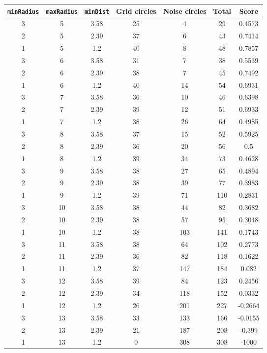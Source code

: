 \documentclass[letterpaper, 12pt]{article}
\begin{document}
\begin{longtable}{|c|c|c|c|c|c|c|}
\hline
\textbf{\texttt{minRadius}} & \textbf{\texttt{maxRadius}} & \textbf{\texttt{minDist}} & \textbf{Grid circles} & \textbf{Noise circles} & \textbf{Total} & \textbf{Score} \\
\hline
3 & 5 & 3.58 & 25 & 4 & 29 & 0.4573 \\
\hline
2 & 5 & 2.39 & 37 & 6 & 43 & 0.7414 \\
\hline
1 & 5 & 1.2 & 40 & 8 & 48 & 0.7857 \\
\hline
3 & 6 & 3.58 & 31 & 7 & 38 & 0.5539 \\
\hline
2 & 6 & 2.39 & 38 & 7 & 45 & 0.7492 \\
\hline
1 & 6 & 1.2 & 40 & 14 & 54 & 0.6931 \\
\hline
3 & 7 & 3.58 & 36 & 10 & 46 & 0.6398 \\
\hline
2 & 7 & 2.39 & 39 & 12 & 51 & 0.6933 \\
\hline
1 & 7 & 1.2 & 38 & 26 & 64 & 0.4985 \\
\hline
3 & 8 & 3.58 & 37 & 15 & 52 & 0.5925 \\
\hline
2 & 8 & 2.39 & 36 & 20 & 56 & 0.5 \\
\hline
1 & 8 & 1.2 & 39 & 34 & 73 & 0.4628 \\
\hline
3 & 9 & 3.58 & 38 & 27 & 65 & 0.4894 \\
\hline
2 & 9 & 2.39 & 38 & 39 & 77 & 0.3983 \\
\hline
1 & 9 & 1.2 & 39 & 71 & 110 & 0.2831 \\
\hline
3 & 10 & 3.58 & 38 & 44 & 82 & 0.3682 \\
\hline
2 & 10 & 2.39 & 38 & 57 & 95 & 0.3048 \\
\hline
1 & 10 & 1.2 & 38 & 103 & 141 & 0.1743 \\
\hline
3 & 11 & 3.58 & 38 & 64 & 102 & 0.2773 \\
\hline
2 & 11 & 2.39 & 36 & 82 & 118 & 0.1622 \\
\hline
1 & 11 & 1.2 & 37 & 147 & 184 & 0.082 \\
\hline
3 & 12 & 3.58 & 39 & 84 & 123 & 0.2456 \\
\hline
2 & 12 & 2.39 & 34 & 118 & 152 & 0.0332 \\
\hline
1 & 12 & 1.2 & 26 & 201 & 227 & -0.2664 \\
\hline
3 & 13 & 3.58 & 33 & 133 & 166 & -0.0155 \\
\hline
2 & 13 & 2.39 & 21 & 187 & 208 & -0.399 \\
\hline
1 & 13 & 1.2 & 0 & 308 & 308 & -1000 \\

\end{longtable}
\end{document}
